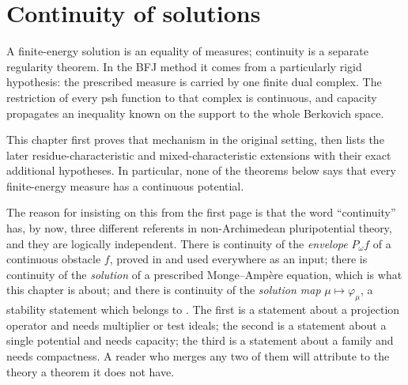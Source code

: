 \chapter{Continuity of solutions}
\label{chap:bfj-continuity}

A finite-energy solution is an equality of measures; continuity is a
separate regularity theorem.  In the BFJ method it comes from a particularly
rigid hypothesis: the prescribed measure is carried by one finite dual
complex.  The restriction of every psh function to that complex is
continuous, and capacity propagates an inequality known on the support to
the whole Berkovich space.

This chapter first proves that mechanism in the original setting, then lists
the later residue-characteristic and mixed-characteristic extensions with
their exact additional hypotheses.  In particular, none of the theorems
below says that every finite-energy measure has a continuous potential.

The reason for insisting on this from the first page is that the word
``continuity'' has, by now, three different referents in non-Archimedean
pluripotential theory, and they are logically independent.  There is
continuity of the \emph{envelope} $P_\omega f$ of a continuous obstacle
$f$, proved in  and used everywhere as an input;
there is continuity of the \emph{solution} of a prescribed Monge--Amp\`ere
equation, which is what this chapter is about; and there is continuity of
the \emph{solution map} $\mu\mapsto\varphi_\mu$, a stability statement
which belongs to .  The first is a
statement about a projection operator and needs multiplier or test ideals;
the second is a statement about a single potential and needs capacity; the
third is a statement about a family and needs compactness.  A reader who
merges any two of them will attribute to the theory a theorem it does not
have.

